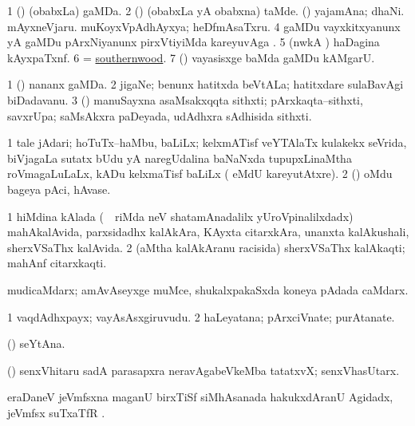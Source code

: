 \bentry
{}
\gl{\nA}
\bmng
\bnum
\num{1} (\AmA) (obabxLa) gaMDa. 
\num{2} (\AmA) (obabxLa yA obabxna) taMde. 
 (\ashi) 
\banum
{} yajamAna; dhaNi. 
 mAyxneVjaru. 
 muKoyxVpAdhAyxya; heDfmAsaTxru. 
\eanum
\numie
\num{4} gaMDu vayxkitxyanunx yA gaMDu pArxNiyanunx pirxVtiyiMda kareyuvAga \parx. 
\num{5} (nwkA \ashi) haDagina kAyxpaTxnf. 
\num{6} = \hyperref{kandict_s.pdf}{S}{southernwood}{southernwood}. 
\num{7} (\AseTxrXV) vayasisxge baMda gaMDu kAMgarU. 
\enum
\emng

\noindent
\gl{\pagu}
\bmng
\bnum
\num{1}  (\AmA) nananx gaMDa. 
\num{2}  jigaNe; benunx hatitxda beVtALa; hatitxdare sulaBavAgi biDadavanu. 
\num{3}  (\deVva) manuSayxna asaMsakxqqta sithxti; pArxkaqta--sithxti, savxrUpa; saMsAkxra paDeyada, udAdhxra sAdhisida sithxti. 
\enum
\emng
\eentry

\bentry
{}
\gl{\nA}
\bmng
\bnum
\num{1} tale jAdari; hoTuTx--haMbu, baLiLx; kelxmATisf veYTAlaTx kulakekx seVrida, biVjagaLa sutatx bUdu yA naregUdalina baNaNxda tupupxLinaMtha roVmagaLuLaLx, kADu kelxmaTisf baLiLx ( eMdU kareyutAtxre). 
\num{2} (\ame) oMdu bageya pAci, hAvase. 
\enum
\emng
\eentry

\bentry
{}
\gl{\nA}
\bmng
\bnum
\num{1} hiMdina kAlada (\kanmu\ \kirxsha\ riMda neV shatamAnadalilx yUroVpinalilxdadx) mahAkalAvida, parxsidadhx kalAkAra, KAyxta citarxkAra, unanxta kalAkushali, sherxVSaThx kalAvida. 
\num{2} (aMtha kalAkAranu racisida) sherxVSaThx kalAkaqti; mahAnf citarxkaqti. 
\enum
\emng
\eentry

\bentry
{}
\gl{\nA}
\bmng
mudicaMdarx; amAvAseyxge muMce, shukalxpakaSxda koneya pAdada caMdarx. 
\emng
\eentry

\bentry
{}
\gl{\nA}
\bmng
\bnum
\num{1} vaqdAdhxpayx; vayAsAsxgiruvudu. 
\num{2} haLeyatana; pArxciVnate; purAtanate. 
\enum
\emng
\eentry

\bentry
{}
\gl{\nA}
\bmng
(\AmA) seYtAna. 
\emng
\eentry

\bentry
{}
\gl{\nA}
\bmng
(\birx) senxVhitaru sadA parasapxra neravAgabeVkeMba tatatxvX; senxVhasUtarx. 
\emng
\eentry

\bentry
{}
\gl{\nA}
\bmng
eraDaneV jeVmfsxna maganU birxTiSf siMhAsanada hakukxdAranU Agidadx, jeVmfsx suTxaTfR . 
\emng
\eentry

